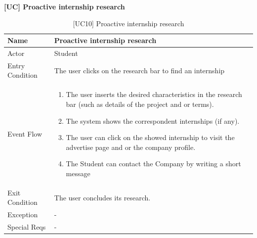\textbf{[UC\nextUseCases] Proactive internship research}
\begin{table}[H] %
    \centering
    \begin{tabular}{|p{3cm}|p{10cm}|}
    \hline
    Name & Proactive internship research \\ \hline
    Actor  & Student \\ \hline
    Entry Condition  & The user clicks on the research bar to find an internship \\ \hline
    Event Flow  & 
    \begin{enumerate}[noitemsep, topsep=0pt]
        \item The user inserts the desired characteristics in the research bar (such as details of the project and or terms).
        \item The system shows the correspondent internships (if any).
        \item The user can click on the showed internship to visit the advertise page and or the company profile.
        \item The Student can contact the Company by writing a short message
    \end{enumerate}
    \\ \hline
    Exit Condition  & The user concludes its research. \\ \hline
    Exception  & - \\ \hline
    Special Reqs  & - \\ \hline
    \end{tabular}
    \caption{[UC10] Proactive internship research}
\end{table}

